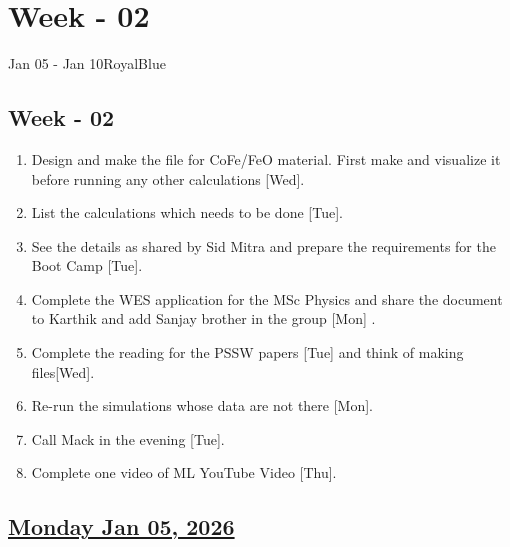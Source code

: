 \section{Week - 02}
\begin{physicsmodule}{Jan 05 - Jan 10}{RoyalBlue}
  \begin{lawbox}
    \subsection*{\sffamily\bfseries Week - 02}
    \begin{enumerate}
    \item Design and make the file for CoFe/FeO material. First make and visualize it before running any other calculations [Wed].
    \item List the calculations which needs to be done [Tue].
    \item See the details as shared by Sid Mitra and prepare the requirements for the Boot Camp [Tue]. 
    \item Complete the WES application for the MSc Physics and share the document to Karthik and add Sanjay brother in the group [Mon] \cmark.
    \item Complete the reading for the PSSW papers [Tue] and think of making files[Wed]. 
    \item Re-run the simulations whose data are not there [Mon]. 
    \item Call Mack in the evening [Tue].
    \item Complete one video of ML YouTube Video [Thu].
\end{enumerate}
  \end{lawbox}
\end{physicsmodule}
\subsection*{\underline{Monday Jan 05, 2026}}
